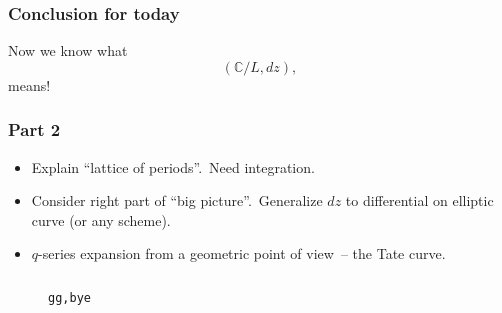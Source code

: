 \documentclass[usenames,dvipsnames]{beamer}
\theoremstyle{definition}
\begin{document}
\begin{frame}
  \frametitle{Conclusion for today}
  Now we know what
  \[(\mathbb{C}/L,dz),\]
  means!
\end{frame}

\begin{frame}
  \frametitle{Part 2}
  \begin{itemize}
    \item Explain ``lattice of periods''.\pause~Need integration.\pause
    \item Consider right part of ``big picture''.\pause~Generalize $dz$ to differential on elliptic curve (or any scheme).\pause
    \item $q$-series expansion from a geometric point of view\pause~-- the Tate curve.
  \end{itemize}
\end{frame}

\begin{frame}
  \frametitle{}
  \begin{figure}[h]
    \centering
    {\Huge\tt gg,bye}
  \end{figure}
\end{frame}
\end{document}
